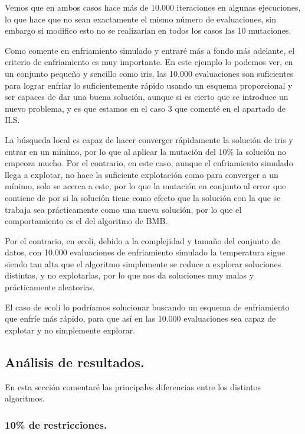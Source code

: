 \documentclass[12pt, spanish]{article}
\begin{document}
Vemos que en ambos casos hace más de 10.000 iteraciones en algunas ejecuciones, lo que hace que no sean exactamente el mismo número de evaluaciones, sin embargo si modifico esto no se realizarían en todos los casos las 10 mutaciones.

Como comente en enfriamiento simulado y entraré más a fondo más adelante, el criterio de enfriamiento es muy importante. En este ejemplo lo podemos ver, en un conjunto pequeño y sencillo como iris, las 10.000 evaluaciones son suficientes para lograr enfriar lo suficientemente rápido usando un esquema proporcional y ser capaces de dar una buena solución, aunque si es cierto que se introduce un nuevo problema, y es que estamos en el caso 3 que comenté en  el apartado de ILS. 

La búsqueda local es capaz de hacer converger rápidamente la solución de iris y entrar en un mínimo, por lo que al aplicar la mutación del 10\% la solución no empeora mucho. Por el contrario, en este caso, aunque el enfriamiento simulado llega a explotar, no hace la suficiente explotación como para converger a un mínimo, solo se acerca a este, por lo que la mutación en conjunto al error que contiene de por si la solución tiene como efecto que la solución con la que se trabaja sea prácticamente como una nueva solución, por lo que el comportamiento es el del algoritmo de BMB. 


Por el contrario, en ecoli, debido a la complejidad y tamaño del conjunto de datos, con 10.000 evaluaciones de enfriamiento simulado la temperatura sigue siendo tan alta que el algoritmo simplemente se reduce a explorar soluciones distintas, y no explotarlas, por lo que nos da soluciones muy malas y prácticamente aleatorias.

El caso de ecoli lo podríamos solucionar buscando un esquema de enfriamiento que enfríe más rápido, para que así en las 10.000 evaluaciones sea capaz de explotar y no simplemente explorar.


\subsection{Análisis de resultados.	}

En esta sección comentaré las principales diferencias entre los distintos algoritmos.

\subsubsection{10\% de restricciones.}
\end{document}
